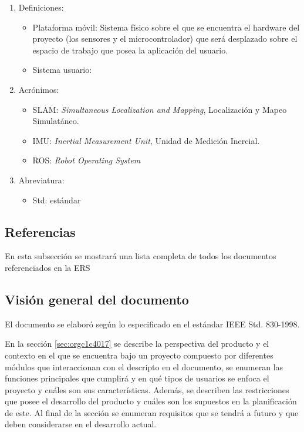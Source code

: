 \documentclass[12pt,a4paper, twosite]{article}
\begin{document}
\begin{enumerate}
  \item Definiciones:
  \begin{itemize}
    \item Plataforma móvil: Sistema físico sobre el que se encuentra el hardware del proyecto
    (los sensores y el microcontrolador) que será desplazado sobre el espacio de trabajo que posea
    la aplicación del usuario.
    \item Sistema usuario: 
  \end{itemize}
  \item Acrónimos:
  \begin{itemize}
    \item SLAM: \textit{Simultaneous Localization and Mapping}, Localización y Mapeo Simulatáneo.
    \item IMU: \textit{Inertial Measurement Unit}, Unidad de Medición Inercial.
    \item ROS: \textit{Robot Operating System}
  \end{itemize}
  \item Abreviatura:
  \begin{itemize}
    \item Std: estándar
  \end{itemize}
\end{enumerate}


\subsection{Referencias}
\label{sec:org62711e0}

En esta subsección se mostrará una lista completa de todos los
documentos referenciados en la ERS


\subsection{Visión general del documento}
\label{sec:orgdaca22c}


El documento se elaboró según lo especificado en el estándar IEEE Std. 830-1998.

En la sección \ref{sec:orgc1c4017} se describe la perspectiva del producto y el contexto
en el que se encuentra bajo un proyecto compuesto por diferentes módulos que interaccionan con
el descripto en el documento, se enumeran las funciones principales que cumplirá y en qué tipos
de usuarios se enfoca el proyecto y cuáles son sus características. Además, se describen las
restricciones que posee el desarrollo del producto y cuáles son los supuestos en la
planificación de este. Al final de la sección se enumeran requisitos que se tendrá a futuro y
que deben considerarse en el desarrollo actual.
\end{document}
